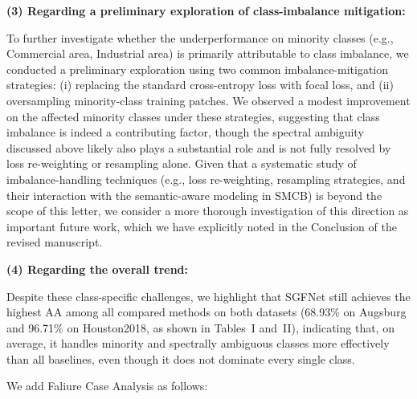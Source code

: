 \textbf{(3) Regarding a preliminary exploration of class-imbalance mitigation:}

To further investigate whether the underperformance on minority classes (e.g., Commercial area, Industrial area) is primarily attributable to class imbalance, we conducted a preliminary exploration using two common imbalance-mitigation strategies: (i) replacing the standard cross-entropy loss with focal loss, and (ii) oversampling minority-class training patches. We observed a modest improvement on the affected minority classes under these strategies, suggesting that class imbalance is indeed a contributing factor, though the spectral ambiguity discussed above likely also plays a substantial role and is not fully resolved by loss re-weighting or resampling alone. Given that a systematic study of imbalance-handling techniques (e.g., loss re-weighting, resampling strategies, and their interaction with the semantic-aware modeling in SMCB) is beyond the scope of this letter, we consider a more thorough investigation of this direction as important future work, which we have explicitly noted in the Conclusion of the revised manuscript.

\textbf{(4) Regarding the overall trend:}

Despite these class-specific challenges, we highlight that SGFNet still achieves the highest AA among all compared methods on both datasets (68.93\% on Augsburg and 96.71\% on Houston2018, as shown in Tables~I and~II), indicating that, on average, it handles minority and spectrally ambiguous classes more effectively than all baselines, even though it does not dominate every single class.

We add Faliure Case Analysis as follows:

